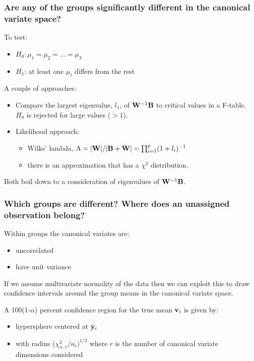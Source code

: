 \documentclass{beamer}
\begin{document}
\begin{frame}
  \frametitle{Are any of the groups significantly different in the canonical variate space?}

To test:
\begin{itemize}
\item $H_0: \mu_1 = \mu_2 = \ldots = \mu_3$
\item $H_1$: at least one $\mu_i$ differs from the rest
\end{itemize}

A couple of approaches:
\begin{itemize}
\item  Compare the largest eigenvalue, $l_1$, of $\mathbf{W}^{-1}\mathbf{B}$ to critical values in a F-table. $H_0$ is rejected for large values ($>1$).
\item Likelihood approach: 
\begin{itemize}
\item Wilks' lambda, $\Lambda = |\mathbf{W}|/|\mathbf{B} + \mathbf{W}| = \prod_{i=1}^{p} (1 + l_i)^{-1}$
\item there is an approximation that has a $\chi^2$ distribution.
\end{itemize}
\end{itemize}

Both boil down to a consideration of eigenvalues of $\mathbf{W}^{-1}\mathbf{B}$.

\end{frame}


\begin{frame}
  \frametitle{Which groups are different? Where does an unassigned observation belong?}
  
Within groups the canonical variates are: 
\begin{itemize}
\item uncorrelated
\item have unit variance
\end{itemize}

If we assume multivariate normality of the data then we can exploit this to draw confidence intervals around the group means in the canonical variate space.
\smallskip

A 100(1-$\alpha$) percent confidence region for the true mean $\mathbf{v}_i$ is given by:
\begin{itemize}
\item hypersphere centered at $\bar{\mathbf{y}}_i$
\item with radius ($\chi^{2}_{\alpha,r}/n_i)^{1/2}$ where $r$ is the number of canonical variate dimensions considered
\end{itemize}

\end{frame}
\end{document}
